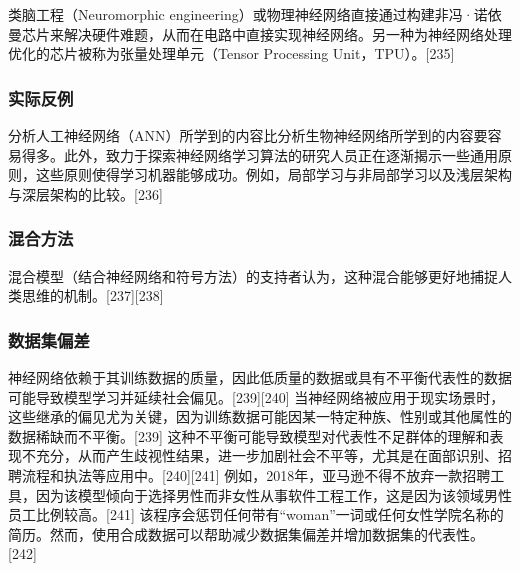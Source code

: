 类脑工程（Neuromorphic engineering）或物理神经网络直接通过构建非冯·诺依曼芯片来解决硬件难题，从而在电路中直接实现神经网络。另一种为神经网络处理优化的芯片被称为张量处理单元（Tensor Processing Unit，TPU）。[235]
\subsubsection{实际反例}
分析人工神经网络（ANN）所学到的内容比分析生物神经网络所学到的内容要容易得多。此外，致力于探索神经网络学习算法的研究人员正在逐渐揭示一些通用原则，这些原则使得学习机器能够成功。例如，局部学习与非局部学习以及浅层架构与深层架构的比较。[236]
\subsubsection{混合方法}
混合模型（结合神经网络和符号方法）的支持者认为，这种混合能够更好地捕捉人类思维的机制。[237][238]
\subsubsection{数据集偏差}
神经网络依赖于其训练数据的质量，因此低质量的数据或具有不平衡代表性的数据可能导致模型学习并延续社会偏见。[239][240] 当神经网络被应用于现实场景时，这些继承的偏见尤为关键，因为训练数据可能因某一特定种族、性别或其他属性的数据稀缺而不平衡。[239] 这种不平衡可能导致模型对代表性不足群体的理解和表现不充分，从而产生歧视性结果，进一步加剧社会不平等，尤其是在面部识别、招聘流程和执法等应用中。[240][241] 例如，2018年，亚马逊不得不放弃一款招聘工具，因为该模型倾向于选择男性而非女性从事软件工程工作，这是因为该领域男性员工比例较高。[241] 该程序会惩罚任何带有“woman”一词或任何女性学院名称的简历。然而，使用合成数据可以帮助减少数据集偏差并增加数据集的代表性。[242]
